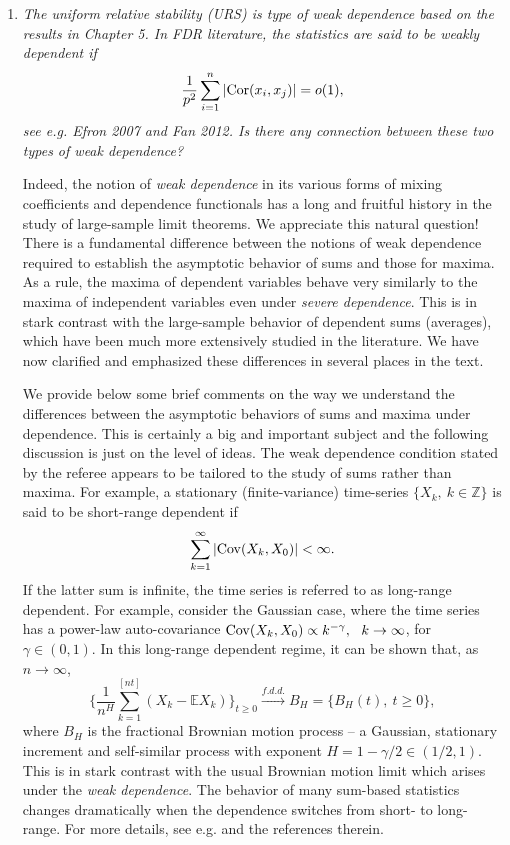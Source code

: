 \documentclass[11pt]{article}
\begin{document}
\begin{enumerate}
        
        \item {\em The uniform relative stability (URS) is type of weak dependence based on the results in Chapter 5. In FDR literature, the statistics are 
        said to be weakly dependent if 
        $$
        \frac{1}{p^2} \sum_{i=1}^n |{\rm Cor}(x_i,x_j)| = o(1),
        $$
see e.g. Efron 2007 and Fan 2012. Is there any connection between these two types of weak dependence?}

   \medskip
   \noindent Indeed, the notion of {\em weak dependence} in its various forms of mixing coefficients and dependence functionals
    has a long and fruitful history in the study of large-sample limit theorems.  We appreciate this natural question!  There is a fundamental 
    difference between the notions of weak dependence required to establish the asymptotic behavior of sums and those for maxima.     
    As a rule, the maxima of dependent variables behave
   very similarly to the maxima of independent variables even under {\em severe dependence}.  This is in stark contrast with the large-sample 
   behavior of dependent sums (averages), which have been much more extensively studied in the literature.  We have now
    clarified and emphasized these differences in several places in the text. 
    
    We provide below some brief comments on the way we understand the differences between the asymptotic behaviors of sums and maxima 
    under dependence.  This is certainly a big and important subject and the following discussion is just on the level of ideas.
    The weak dependence condition stated by the referee appears to be tailored to the study of sums rather than maxima.  For example, a 
    stationary (finite-variance) time-series $\{X_k,\ k\in \mathbb Z\}$ is said to be short-range dependent if
   $$
   \sum_{k=1}^\infty |{\rm Cov} (X_{k}, X_0) | <\infty.
   $$
   If the latter sum is infinite, the time series is referred to as long-range dependent. For example, consider the Gaussian case, where
   the time series has a power-law auto-covariance ${\rm Cov}(X_{k}, X_0) \propto k^{-\gamma},\ \ k\to\infty$, for $\gamma \in (0,1)$.  In this long-range
   dependent regime, it can be shown that, as $n\to\infty$,
  $$
  \Big\{ \frac{1}{n^H} \sum_{k=1}^{[nt]} (X_k -\mathbb E X_k) \Big\}_{t\ge 0} \stackrel{f.d.d.}{\longrightarrow} B_H = \{B_H(t),\ t\ge 0\},
  $$   
  where $B_H$ is the fractional Brownian motion process -- a Gaussian, stationary increment and  self-similar process with 
  exponent $H = 1 - \gamma/2 \in (1/2,1)$.  This is in stark contrast with the usual Brownian motion limit which arises 
  under the {\em weak dependence}.  The behavior of many sum-based statistics changes dramatically when the dependence switches from
  short- to long-range.  For more details, see e.g. \cite{pipiras:taqqu:2017} and the references therein.
  

\end{enumerate}
\end{document}
